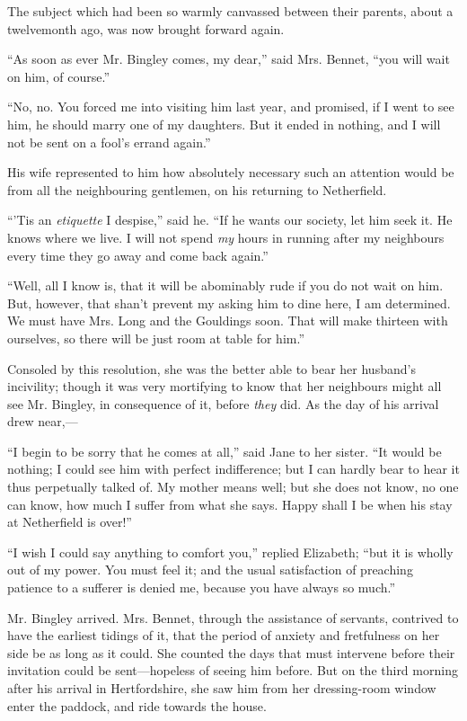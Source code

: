 \documentclass[12pt]{book}
\begin{document}
The subject which had been so warmly canvassed between their parents, about a twelvemonth ago, was now brought forward again.

``As soon as ever Mr. Bingley comes, my dear,'' said Mrs. Bennet, ``you will wait on him, of course.''

``No, no. You forced me into visiting him last year, and promised, if I went to see him, he should marry one of my daughters. But it ended in nothing, and I will not be sent on a fool's errand again.''

His wife represented to him how absolutely necessary such an attention would be from all the neighbouring gentlemen, on his returning to Netherfield.

``'Tis an \textit{etiquette} I despise,'' said he. ``If he wants our society, let him seek it. He knows where we live. I will not spend \textit{my} hours in running after my neighbours every time they go away and come back again.''

``Well, all I know is, that it will be abominably rude if you do not wait on him. But, however, that shan't prevent my asking him to dine here, I am determined. We must have Mrs. Long and the Gouldings soon. That will make thirteen with ourselves, so there will be just room at table for him.''

Consoled by this resolution, she was the better able to bear her husband's incivility; though it was very mortifying to know that her neighbours might all see Mr. Bingley, in consequence of it, before \textit{they} did. As the day of his arrival drew near,---

``I begin to be sorry that he comes at all,'' said Jane to her sister. ``It would be nothing; I could see him with perfect indifference; but I can hardly bear to hear it thus perpetually talked of. My mother means well; but she does not know, no one can know, how much I suffer from what she says. Happy shall I be when his stay at Netherfield is over!''

``I wish I could say anything to comfort you,'' replied Elizabeth; ``but it is wholly out of my power. You must feel it; and the usual satisfaction of preaching patience to a sufferer is denied me, because you have always so much.''

Mr. Bingley arrived. Mrs. Bennet, through the assistance of servants, contrived to have the earliest tidings of it, that the period of anxiety and fretfulness on her side be as long as it could. She counted the days that must intervene before their invitation could be sent---hopeless of seeing him before. But on the third morning after his arrival in Hertfordshire, she saw him from her dressing-room window enter the paddock, and ride towards the house.
\end{document}
